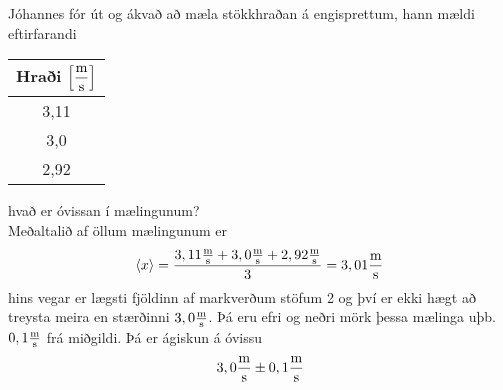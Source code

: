 \begin{formalexample}
	Jóhannes fór út og ákvað að mæla stökkhraðan á engisprettum, hann
	mældi eftirfarandi \\
	\begin{center}
	\begin{tabular}{c}
		\toprule
		Hraði $\displaystyle\left[\frac{\textrm{m}}{\textrm{s}}\right]$ \\
		\midrule
		3,11 \\
		3,0 \\
		2,92 \\
		\bottomrule
	\end{tabular}
	\end{center}
	hvað er óvissan í mælingunum?
	\\[2ex]
	Meðaltalið af öllum mælingunum er
	\[
		\left< x \right> 
			= \frac{3,11 \frac{\textrm{m}}{\textrm{s}} + 3,0 \frac{\textrm{m}}{\textrm{s}} + 2,92 \frac{\textrm{m}}{\textrm{s}}}{3} 
			= 3,01 \frac{\textrm{m}}{\textrm{s}}
	\]
	hins vegar er lægsti fjöldinn af markverðum stöfum 2 og því er ekki
	hægt að treysta meira en stærðinni $3,0 \frac{\textrm{m}}{\textrm{s}}$. Þá eru efri og
	neðri mörk þessa mælinga uþb. $0,1 \frac{\textrm{m}}{\textrm{s}}$ frá miðgildi. Þá er
	ágiskun á óvissu
	\[
		3,0 \frac{\textrm{m}}{\textrm{s}} \pm 0,1 \frac{\textrm{m}}{\textrm{s}}
	\]
\end{formalexample}


